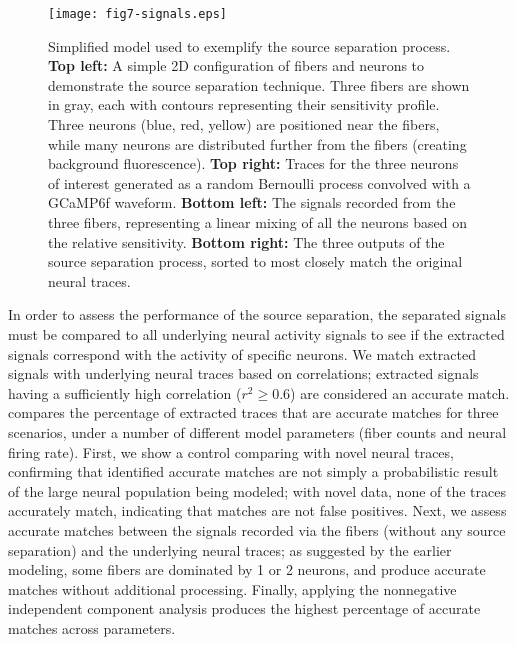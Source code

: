 \begin{figure}
\texttt{[image: fig7-signals.eps]}
\caption[Application of source separation to simple model]{Simplified model used to exemplify the source separation process. \textbf{Top left:} A simple 2D configuration of fibers and neurons to demonstrate the source separation technique. Three fibers are shown in gray, each with contours representing their sensitivity profile. Three neurons (blue, red, yellow) are positioned near the fibers, while many neurons are distributed further from the fibers (creating background fluorescence). \textbf{Top right:} Traces for the three neurons of interest generated as a random Bernoulli process convolved with a GCaMP6f waveform. \textbf{Bottom left:} The signals recorded from the three fibers, representing a linear mixing of all the neurons based on the relative sensitivity. \textbf{Bottom right:} The three outputs of the source separation process, sorted to most closely match the original neural traces.}
\label{fig:signals}
\end{figure}

In order to assess the performance of the source separation, the 
separated signals must be compared to all underlying neural activity 
signals to see if the extracted signals correspond with the activity 
of specific neurons. We match extracted signals with underlying neural
 traces based on correlations; extracted signals having a sufficiently
 high correlation ($r^2 \geq 0.6$) are considered an accurate match. 
 compares the percentage of extracted traces that are accurate
 matches for three scenarios, under a number of different model 
parameters (fiber counts and neural firing rate). First, we show a 
control comparing with novel neural traces, confirming that identified
 accurate matches are not simply a probabilistic result of the large 
neural population being modeled; with novel data, none of the traces 
accurately match, indicating that matches are not false positives. 
Next, we assess accurate matches between the signals recorded via the 
fibers (without any source separation) and the underlying neural 
traces; as suggested by the earlier modeling, some fibers are 
dominated by 1 or 2 neurons, and produce accurate matches without 
additional processing. Finally, applying the nonnegative independent 
component analysis produces the highest percentage of accurate matches
 across parameters.

